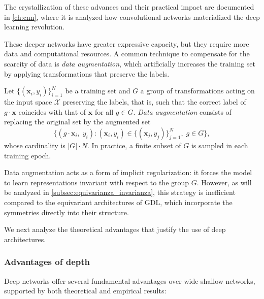 The crystallization of these advances and their practical impact are documented in \autoref{ch:cnn}, where it is analyzed how convolutional networks materialized the deep learning revolution.

These deeper networks have greater expressive capacity, but they require more data and computational resources. A common technique to compensate for the scarcity of data is \textit{data augmentation}, which artificially increases the training set by applying transformations that preserve the labels.

\begin{definition}\label{def:data_augmentation}
	Let $\{(\mathbf{x}_i, y_i)\}_{i=1}^N$ be a training set and $G$ a group of transformations acting on the input space $\mathcal{X}$ preserving the labels, that is, such that the correct label of $g \cdot \mathbf{x}$ coincides with that of $\mathbf{x}$ for all $g \in G$. \textit{Data augmentation} consists of replacing the original set by the augmented set
	\[
		\{(g \cdot \mathbf{x}_i,\; y_i) : (\mathbf{x}_i, y_i) \in \{(\mathbf{x}_j, y_j)\}_{j=1}^N,\; g \in G\},
	\]
	whose cardinality is $|G| \cdot N$. In practice, a finite subset of $G$ is sampled in each training epoch.
\end{definition}

Data augmentation acts as a form of implicit regularization: it forces the model to learn representations invariant with respect to the group $G$. However, as will be analyzed in \autoref{subsec:equivarianza_invarianza}, this strategy is inefficient compared to the equivariant architectures of \gls{GDL}, which incorporate the symmetries directly into their structure.

We next analyze the theoretical advantages that justify the use of deep architectures.

\subsubsection{Advantages of depth}

Deep networks offer several fundamental advantages over wide shallow networks, supported by both theoretical and empirical results:

